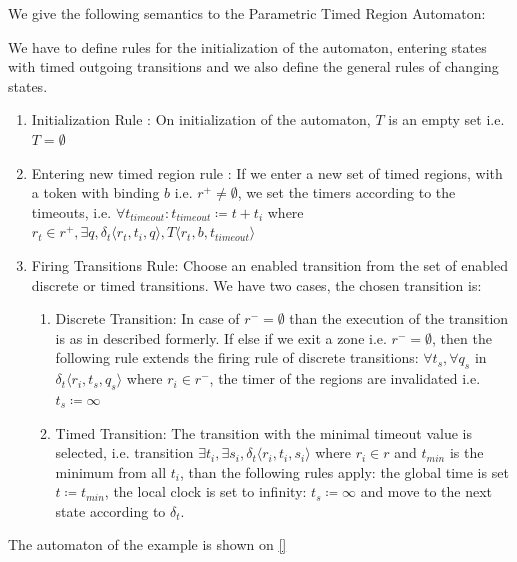 				We give the following semantics to the Parametric Timed Region Automaton:
				
				We have to define rules for the initialization of the automaton,
				entering states with timed outgoing transitions 
				and we also define the general rules of changing states. 
				
				\begin{enumerate}
					\item Initialization Rule : On initialization of the automaton, $T$ is an empty set
					i.e. $T = \emptyset$
				
					\item Entering new timed region rule :
					If we enter a new set of timed regions, with a token with binding $b$ 
					i.e. $r^+ \neq \emptyset$, 
					we set the timers according to the timeouts, 
					i.e. $\forall t_{timeout} : t_{timeout} \coloneqq t + t_i $ where $ r_t \in r^+, \exists q ,\delta_t\langle  r_t,t_i,q \rangle, T \langle r_t,b, t_{timeout} \rangle$
					
					\item Firing Transitions Rule: Choose an enabled transition from the set of enabled discrete or timed transitions. 
					We have two cases, the chosen transition is:
						\begin{enumerate}
							\item Discrete Transition: In case of $r^- = \emptyset$ than the execution of the transition is as in described formerly. 
								If else if we exit a zone i.e. $r^- = \emptyset$, 
								then the following rule extends the firing rule of discrete transitions:
								$\forall t_s, \forall q_s$ in $ \delta_t \langle r_i, t_s, q_s \rangle$ where $r_i \in r^-$, the timer of the regions are invalidated i.e.
								$t_s \coloneqq \infty$
							\item Timed Transition: The transition with the minimal timeout value is selected, 
								 i.e. transition $\exists t_i, \exists s_i, \delta_t \langle r_i, t_i, s_i \rangle$ where $ r_i \in r$ and $t_{min}$ is the minimum from all $t_i$,
								 than the following rules apply:
								 the global time is set $t \coloneqq t_{min}$, 
								 the local clock is set to infinity: $t_s \coloneqq \infty$ 
								 and move to the next state according to $\delta_t$.
						\end{enumerate}			
				\end{enumerate}

				The automaton of the example is shown on \cref{}
			
